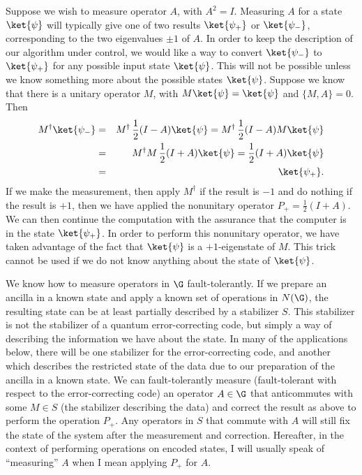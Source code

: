 Suppose we wish to measure operator $A$, with $A^2 = I$.  Measuring $A$
for a state $\ket{\psi}$ will typically give one of two results $\ket{\psi_+}$
or $\ket{\psi_-}$, corresponding to the two eigenvalues $\pm 1$ of $A$.
In order to keep the description of our algorithm under control, we would
like a way to convert $\ket{\psi_-}$ to $\ket{\psi_+}$ for any possible
input state $\ket{\psi}$.  This will not be possible unless we know
something more about the possible states $\ket{\psi}$.  Suppose we know
that there is a unitary operator $M$, with $M \ket{\psi} = \ket{\psi}$ and
$\{M, A\} = 0$.  Then
\begin{eqnarray}
	M^\dagger \ket{\psi_-} & = & M^\dagger \, \frac{1}{2} (I - A) \ket{\psi} =
	M^\dagger \, \frac{1}{2} (I - A) M \ket{\psi} \nonumber \\
	& = & M^\dagger M \, \frac{1}{2} (I + A) \ket{\psi} =
	\frac{1}{2} (I + A) \ket{\psi} \\
	& = & \ket{\psi_+}. \nonumber
\end{eqnarray}
If we make the measurement, then apply $M^\dagger$ if the result is $-1$
and do nothing if the result is $+1$, then we have applied the nonunitary
operator $P_+ = \frac{1}{2} (I + A)$.  We can then continue the computation
with the assurance that the computer is in the state $\ket{\psi_+}$.  In
order to perform this nonunitary operator, we have taken advantage of the
fact that $\ket{\psi}$ is a $+1$-eigenstate of $M$.  This trick cannot
be used if we do not know anything about the state of $\ket{\psi}$.

We know how to measure operators in $\G$ fault-tolerantly.  If we prepare an
ancilla in a known state and apply a known set of operations in $N(\G)$,
the resulting state can be at least partially described by a stabilizer $S$.
This stabilizer is not the stabilizer of a quantum error-correcting code,
but simply a way of describing the information we have about the state.  In
many of the applications below, there will be one stabilizer for the
error-correcting code, and another which describes the restricted state of
the data due to our preparation of the ancilla in a known state.  We can
fault-tolerantly measure (fault-tolerant with respect to the error-correcting
code) an operator $A \in \G$ that anticommutes with some $M \in S$ (the
stabilizer describing the data) and correct the result as above to
perform the operation $P_+$.  Any operators in $S$ that commute with $A$
will still fix the state of the system after the measurement and correction.
Hereafter, in the context of performing operations on encoded states, I will
usually speak of ``measuring'' $A$ when I mean applying $P_+$ for $A$.

